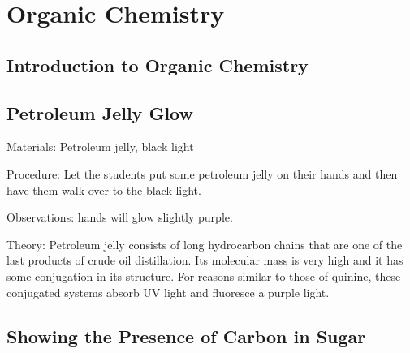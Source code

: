 \section{Organic Chemistry}

\begin{multicols}{2}


\section*{Introduction to Organic Chemistry} %


\subsection{Petroleum Jelly Glow}


\begin{description*}
\item[Materials:]{Petroleum jelly, black light}
\item[Procedure:]{Let the students put some petroleum jelly on their hands and then have them walk over to the black light. }
\item[Observations:]{hands will glow slightly purple.}
\item[Theory:]{Petroleum jelly consists of long hydrocarbon chains that are one of the last products of crude oil distillation. Its molecular mass is very high and it has some conjugation in its structure. For reasons similar to those of quinine, these conjugated systems absorb UV light and fluoresce a purple light.}
\end{description*}

\subsection{Showing the Presence of Carbon in Sugar}



\end{multicols}
